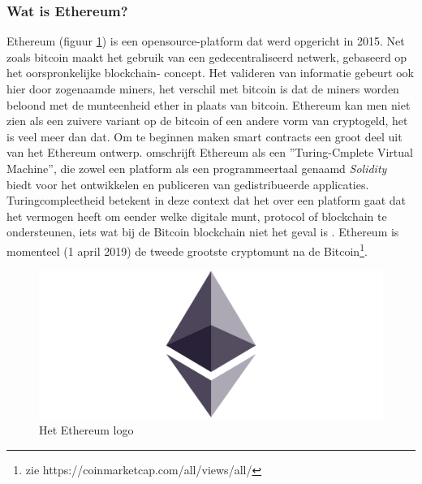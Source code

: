 		\subsubsection{Wat is Ethereum?}
			Ethereum (figuur \ref{fig:ethereum}) is een opensource-platform dat werd opgericht in 2015. Net zoals bitcoin maakt het gebruik van een gedecentraliseerd netwerk, gebaseerd op het oorspronkelijke blockchain- concept. Het valideren van informatie gebeurt ook hier door zogenaamde miners, het verschil met bitcoin is dat de miners worden beloond met de munteenheid ether in plaats van bitcoin. Ethereum kan men niet zien als een zuivere variant op de bitcoin of een andere vorm van cryptogeld, het is veel meer dan dat. Om te beginnen maken smart contracts  een groot deel uit van het Ethereum ontwerp. \textcite{Swan2015} omschrijft Ethereum als een ”Turing-Cmplete Virtual Machine”, die zowel een platform als een programmeertaal genaamd \textit{Solidity} biedt voor het ontwikkelen en publiceren van gedistribueerde applicaties. Turingcompleetheid betekent in deze context dat het over een platform gaat dat het vermogen heeft om eender welke digitale munt, protocol of blockchain te ondersteunen, iets wat bij de Bitcoin blockchain niet het geval is \autocite{Swan2015}. Ethereum is momenteel (1 april 2019) de tweede grootste cryptomunt na de Bitcoin\footnote{zie https://coinmarketcap.com/all/views/all/}. 
			
			\begin{figure}
				\centering
				\includegraphics[width=\linewidth/2]{img/ethereum.png}
				\caption{Het Ethereum logo}
				\label{fig:ethereum}
			\end{figure}
			

